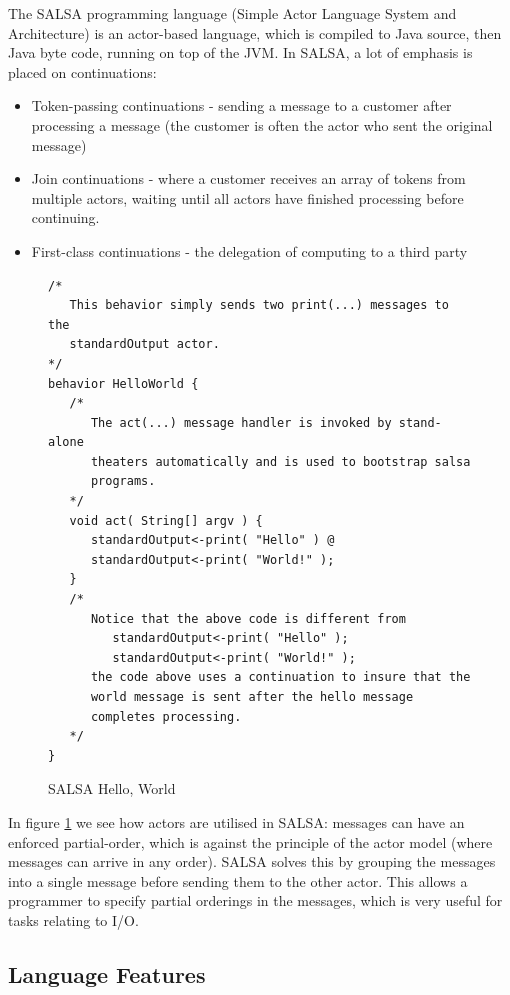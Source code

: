 \documentclass[pdftex,12pt,a4paper]{article}
\begin{document}
The SALSA programming language (Simple Actor Language System and Architecture) is an actor-based language, which is compiled to Java source, then Java byte code, running on top of the JVM.
In SALSA, a lot of emphasis is placed on continuations:
\begin{itemize}[noitemsep]
	\item Token-passing continuations - sending a message to a customer after processing a message (the customer is often the actor who sent the original message)
	\item Join continuations - where a customer receives an array of tokens from multiple actors, waiting until all actors have finished processing before continuing.
	\item First-class continuations - the delegation of computing to a third party\cite{salsa-continuations}
\end{itemize}

\begin{figure}[H]
\begin{verbatim}
/*
   This behavior simply sends two print(...) messages to the 
   standardOutput actor.
*/
behavior HelloWorld {
   /*
      The act(...) message handler is invoked by stand-alone
      theaters automatically and is used to bootstrap salsa
      programs.
   */
   void act( String[] argv ) {
      standardOutput<-print( "Hello" ) @
      standardOutput<-print( "World!" );
   }
   /*
      Notice that the above code is different from 
         standardOutput<-print( "Hello" );
         standardOutput<-print( "World!" );
      the code above uses a continuation to insure that the 
      world message is sent after the hello message 
      completes processing.
   */
}
\end{verbatim}
\caption{SALSA Hello, World\cite{salsa-example}}
\label{fig:salsa-helloworld}
\end{figure}

In figure \ref{fig:salsa-helloworld} we see how actors are utilised in SALSA: messages can have an enforced partial-order, which is against the principle of the actor model (where messages can arrive in any order).
SALSA solves this by grouping the messages into a single message before sending them to the other actor.
This allows a programmer to specify partial orderings in the messages, which is very useful for tasks relating to I/O.

\newpage
\subsection{Language Features}
\end{document}
